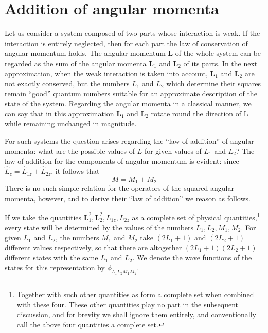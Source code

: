 \section{Addition of angular momenta}\label{Addition of angular momenta}


Let us consider a system composed of two parts whose interaction is weak. If the interaction is entirely neglected, then for each part the law of conservation of angular momentum holds. The angular momentum $ \bm{L} $ of the whole system can be regarded as the sum of the angular momenta $ \bm{L}_1 $ and $ \bm{L}_2 $ of its parts. In the next approximation, when the weak interaction is taken into account, $ \bm{L}_1 $ and $ \bm{L}_2 $ are not exactly conserved, but the numbers $ L_1 $ and $ L_2 $ which determine their squares remain “good” quantum numbers suitable for an approximate description of the state of the system. Regarding the angular momenta in a classical manner, we can say that in this approximation $ \bm{L}_1 $ and $ \bm{L}_2 $ rotate round the direction of L while remaining unchanged in magnitude.

For such systems the question arises regarding the “law of addition” of angular momenta: what are the possible values of $ L $ for given values of $ L_1 $ and $ L_2 $? The law of addition for the components of angular momentum is evident: since $ \hat{L}_z=\hat{L}_{1z}+\hat{L}_{2z} $, it follows that
\begin{equation}\label{31.1}
M=M_1+M_2
\end{equation}
There is no such simple relation for the operators of the squared angular momenta, however, and to derive their “law of addition” we reason as follows.

If we take the quantities $ \bm{L}_1^2 ,  \bm{L}_2^2 ,  L_{1z} ,  L_{2z} $ as a complete set of physical quantities,\footnote{Together with such other quantities as form a complete set when combined with these four. These other quantities play no part in the subsequent discussion, and for brevity we shall ignore them entirely, and conventionally call the above four quantities a complete set.
} every state will be determined by the values of the numbers $ L_1, L_2, M_1, M_2 $. For given $ L_1 $ and $ L_2 $, the numbers $ M_1 $ and $ M_2 $ take $ (2L_1+1) $ and $ (2L_2 + 1) $ different values respectively, so that there are altogether $ (2L_1 + 1) (2L_2+1) $ different states with the same $ L_1 $ and $ L_2 $. We denote the wave functions of the states for this representation by $\phi_{L_1L_2M_1M_2}$.

